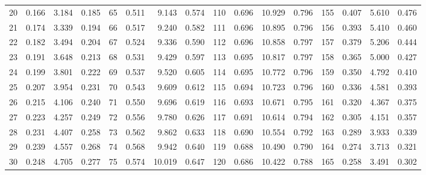 \begin{table}
{\begin{tabular}{rrrr|rrrr|rrrr|rrrr}
 20 & \tiny{  0.166} &   3.184 & \tiny{  0.185} &  65 & \tiny{  0.511} &   9.143 & \tiny{  0.574} & 110 & \tiny{  0.696} &  10.929 & \tiny{  0.796} & 155 & \tiny{  0.407} &   5.610 & \tiny{  0.476}\\
 21 & \tiny{  0.174} &   3.339 & \tiny{  0.194} &  66 & \tiny{  0.517} &   9.240 & \tiny{  0.582} & 111 & \tiny{  0.696} &  10.895 & \tiny{  0.796} & 156 & \tiny{  0.393} &   5.410 & \tiny{  0.460}\\
 22 & \tiny{  0.182} &   3.494 & \tiny{  0.204} &  67 & \tiny{  0.524} &   9.336 & \tiny{  0.590} & 112 & \tiny{  0.696} &  10.858 & \tiny{  0.797} & 157 & \tiny{  0.379} &   5.206 & \tiny{  0.444}\\
 23 & \tiny{  0.191} &   3.648 & \tiny{  0.213} &  68 & \tiny{  0.531} &   9.429 & \tiny{  0.597} & 113 & \tiny{  0.695} &  10.817 & \tiny{  0.797} & 158 & \tiny{  0.365} &   5.000 & \tiny{  0.427}\\
 24 & \tiny{  0.199} &   3.801 & \tiny{  0.222} &  69 & \tiny{  0.537} &   9.520 & \tiny{  0.605} & 114 & \tiny{  0.695} &  10.772 & \tiny{  0.796} & 159 & \tiny{  0.350} &   4.792 & \tiny{  0.410}\\
 25 & \tiny{  0.207} &   3.954 & \tiny{  0.231} &  70 & \tiny{  0.543} &   9.609 & \tiny{  0.612} & 115 & \tiny{  0.694} &  10.723 & \tiny{  0.796} & 160 & \tiny{  0.336} &   4.581 & \tiny{  0.393}\\
 26 & \tiny{  0.215} &   4.106 & \tiny{  0.240} &  71 & \tiny{  0.550} &   9.696 & \tiny{  0.619} & 116 & \tiny{  0.693} &  10.671 & \tiny{  0.795} & 161 & \tiny{  0.320} &   4.367 & \tiny{  0.375}\\
 27 & \tiny{  0.223} &   4.257 & \tiny{  0.249} &  72 & \tiny{  0.556} &   9.780 & \tiny{  0.626} & 117 & \tiny{  0.691} &  10.614 & \tiny{  0.794} & 162 & \tiny{  0.305} &   4.151 & \tiny{  0.357}\\
 28 & \tiny{  0.231} &   4.407 & \tiny{  0.258} &  73 & \tiny{  0.562} &   9.862 & \tiny{  0.633} & 118 & \tiny{  0.690} &  10.554 & \tiny{  0.792} & 163 & \tiny{  0.289} &   3.933 & \tiny{  0.339}\\
 29 & \tiny{  0.239} &   4.557 & \tiny{  0.268} &  74 & \tiny{  0.568} &   9.942 & \tiny{  0.640} & 119 & \tiny{  0.688} &  10.490 & \tiny{  0.790} & 164 & \tiny{  0.274} &   3.713 & \tiny{  0.321}\\
 30 & \tiny{  0.248} &   4.705 & \tiny{  0.277} &  75 & \tiny{  0.574} &  10.019 & \tiny{  0.647} & 120 & \tiny{  0.686} &  10.422 & \tiny{  0.788} & 165 & \tiny{  0.258} &   3.491 & \tiny{  0.302}\\

\end{tabular}}
\end{table}
